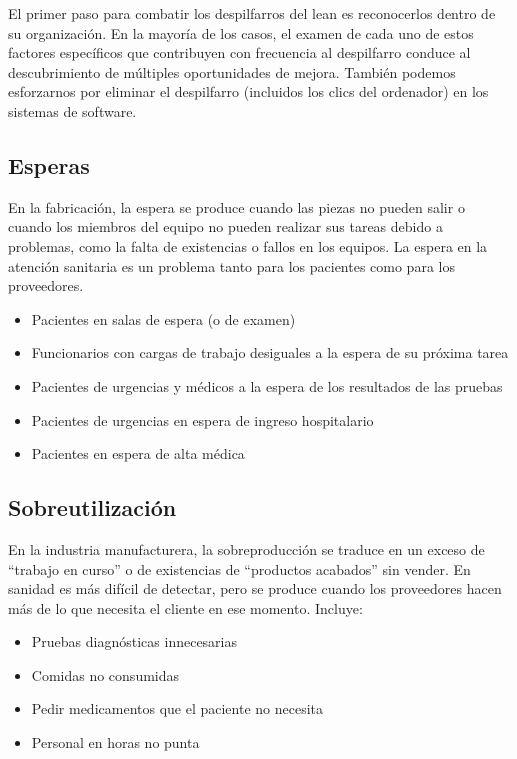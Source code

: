 El primer paso para combatir los despilfarros del lean es reconocerlos dentro de su organización.
En la mayoría de los casos, el examen de cada uno de estos factores específicos que contribuyen con frecuencia al despilfarro conduce al descubrimiento de múltiples oportunidades de mejora.
También podemos esforzarnos por eliminar el despilfarro (incluidos los clics del ordenador) en los sistemas de software.

\subsection{Esperas}

En la fabricación, la espera se produce cuando las piezas no pueden salir o cuando los miembros del equipo no pueden realizar sus tareas debido a problemas, como la falta de existencias o fallos en los equipos.
La espera en la atención sanitaria es un problema tanto para los pacientes como para los proveedores.

\begin{itemize}
    \item Pacientes en salas de espera (o de examen)
    \item Funcionarios con cargas de trabajo desiguales a la espera de su próxima tarea
    \item Pacientes de urgencias y médicos a la espera de los resultados de las pruebas
    \item Pacientes de urgencias en espera de ingreso hospitalario
    \item Pacientes en espera de alta médica
\end{itemize}

\subsection{Sobreutilización}

En la industria manufacturera, la sobreproducción se traduce en un exceso de ``trabajo en curso'' o de existencias de ``productos acabados'' sin vender.
En sanidad es más difícil de detectar, pero se produce cuando los proveedores hacen más de lo que necesita el cliente en ese momento.
Incluye:

\begin{itemize}
    \item Pruebas diagnósticas innecesarias
    \item Comidas no consumidas
    \item Pedir medicamentos que el paciente no necesita
    \item Personal en horas no punta
\end{itemize}

